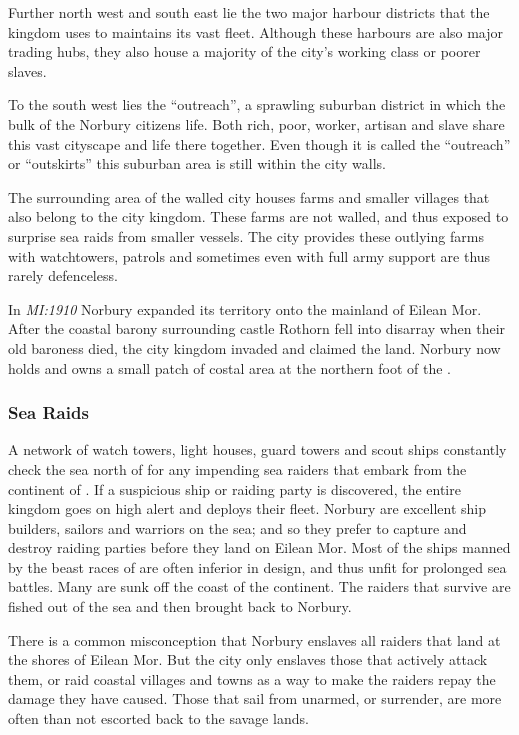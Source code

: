 Further north west and south east lie the two major harbour districts that
the kingdom uses to maintains its vast fleet. Although these harbours are also
major trading hubs, they also house a majority of the city's working class or
poorer slaves.

To the south west lies the ``outreach'', a sprawling suburban district in which
the bulk of the Norbury citizens life. Both rich, poor, worker, artisan and
slave share this vast cityscape and life there together. Even though it is
called the ``outreach'' or ``outskirts'' this suburban area is still within
the city walls.

The surrounding area of the walled city houses farms and smaller villages that
also belong to the city kingdom. These farms are not walled, and thus
exposed to surprise sea raids from smaller vessels. The city provides these
outlying farms with watchtowers, patrols and sometimes even with full army
support are thus rarely defenceless.

In \emph{MI:1910} Norbury expanded its territory onto the mainland of Eilean
Mor. After the coastal barony surrounding castle Rothorn fell into disarray
when their old baroness died, the city kingdom invaded and claimed the land.
Norbury now holds and owns a small patch of costal area at the northern foot
of the .

\subsubsection{Sea Raids}

A network of watch towers, light houses, guard towers and scout ships
constantly check the sea north of  for any impending
sea raiders that embark from the continent of . If a
suspicious ship or raiding party is discovered, the entire kingdom goes on
high alert and deploys their fleet. Norbury are excellent ship builders,
sailors and warriors on the sea; and so they prefer to capture and destroy
raiding parties before they land on Eilean Mor. Most of the ships manned by
the beast races of  are often inferior in design, and
thus unfit for prolonged sea battles. Many are sunk off the coast of the
continent. The raiders that survive are fished out of the sea and then brought
back to Norbury.

There is a common misconception that Norbury enslaves all raiders that land
at the shores of Eilean Mor. But the city only enslaves those that actively
attack them, or raid coastal villages and towns as a way to make the raiders
repay the damage they have caused. Those that sail from 
unarmed, or surrender, are more often than not escorted back to the savage
lands.

